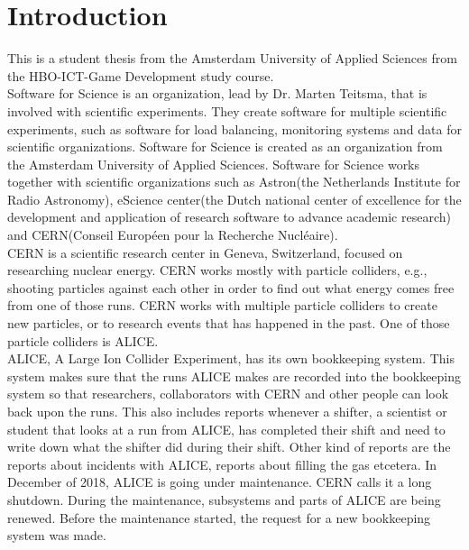 \documentclass[paper=a4, fontsize=11pt,twoside]{scrartcl}	%
\begin{document}
\section{Introduction}
This is a student thesis from the Amsterdam University of Applied Sciences from the HBO-ICT-Game Development study course.  \\
Software for Science is an organization, lead by Dr. Marten Teitsma, that is involved with scientific experiments. They create software for multiple scientific experiments, such as software for load balancing, monitoring systems and data for scientific organizations. Software for Science is created as an organization from the Amsterdam University of Applied Sciences. Software for Science works together with scientific organizations such as Astron(the Netherlands Institute for Radio Astronomy), eScience center(the Dutch national center of excellence for the development and application of research software to advance academic research) and CERN(Conseil Européen pour la Recherche Nucléaire). \\
CERN is a scientific research center in Geneva, Switzerland, focused on researching nuclear energy. CERN works mostly with particle colliders, e.g., shooting particles against each other in order to find out what energy comes free from one of those runs. CERN works with multiple particle colliders to create new particles, or to research events that has happened in the past. One of those particle colliders is ALICE. \\
ALICE, A Large Ion Collider Experiment, has its own bookkeeping system. This system makes sure that the runs ALICE makes are recorded into the bookkeeping system so that researchers, collaborators with CERN and other people can look back upon the runs. This also includes reports whenever a shifter, a scientist or student that looks at a run from ALICE, has completed their shift and need to write down what the shifter did during their shift. Other kind of reports are the reports about incidents with ALICE, reports about filling the gas etcetera. In December of 2018, ALICE is going under maintenance. CERN calls it a long shutdown. During the maintenance, subsystems and parts of ALICE are being renewed. Before the maintenance started, the request for a new bookkeeping system was made. \\

\newpage
\end{document}
